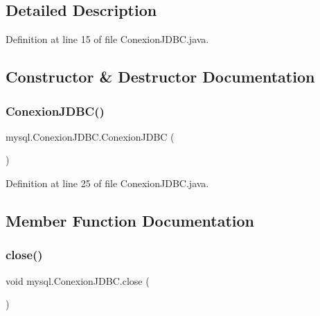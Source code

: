 \subsection{Detailed Description}


Definition at line 15 of file Conexion\+J\+D\+B\+C.\+java.



\subsection{Constructor \& Destructor Documentation}
\mbox{\label{classmysql_1_1_conexion_j_d_b_c_a276e06b39d9d5fc051329194741b2f7c}} 
\subsubsection{\texorpdfstring{Conexion\+J\+D\+B\+C()}{ConexionJDBC()}}
{\footnotesize\ttfamily mysql.\+Conexion\+J\+D\+B\+C.\+Conexion\+J\+D\+BC (\begin{DoxyParamCaption}{ }\end{DoxyParamCaption})}



Definition at line 25 of file Conexion\+J\+D\+B\+C.\+java.



\subsection{Member Function Documentation}
\mbox{\label{classmysql_1_1_conexion_j_d_b_c_a05e552aeb511582e81c6dd6cba120182}} 
\subsubsection{\texorpdfstring{close()}{close()}}
{\footnotesize\ttfamily void mysql.\+Conexion\+J\+D\+B\+C.\+close (\begin{DoxyParamCaption}{ }\end{DoxyParamCaption})}




